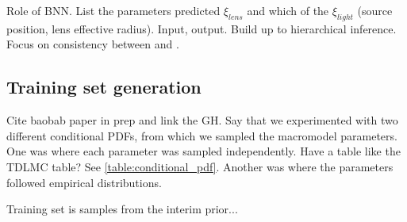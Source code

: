 Role of BNN. List the parameters predicted $\xi_{lens}$ and which of the $\xi_{light}$ (source position, lens effective radius). Input, output. Build up to hierarchical inference. Focus on consistency between \cite{hezaveh2017fast} and \cite{wagnercarena2019double}.

\subsection{Training set generation}
Cite baobab paper in prep and link the GH. Say that we experimented with two different conditional PDFs, from which we sampled the macromodel parameters. One was where each parameter was sampled independently. Have a table like the TDLMC table? See \ref{table:conditional_pdf}. Another was where the parameters followed empirical distributions.

Training set is samples from the interim prior...


